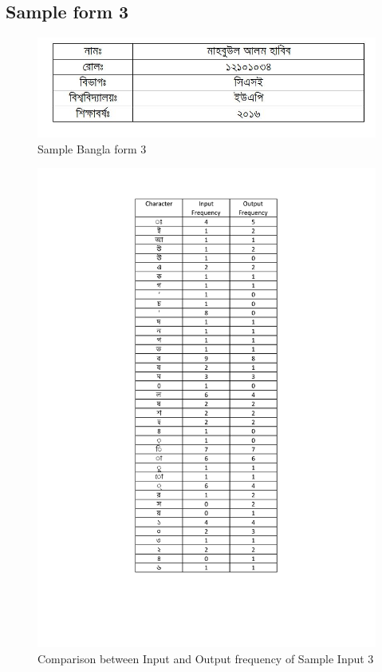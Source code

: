 \subsection{Sample form 3}
\begin{figure}[H]
\centering
\includegraphics[width=1\textwidth]{formBen03.JPG}
\caption {Sample Bangla form 3}
\label {fig:FormBan3}
\end{figure}
\begin{figure}[H]
\centering
\includegraphics[width=1\textwidth \frame]{BTform3}
\caption {Comparison between Input and Output frequency of Sample Input 3}
\label {fig:BTform3}
\end{figure}
